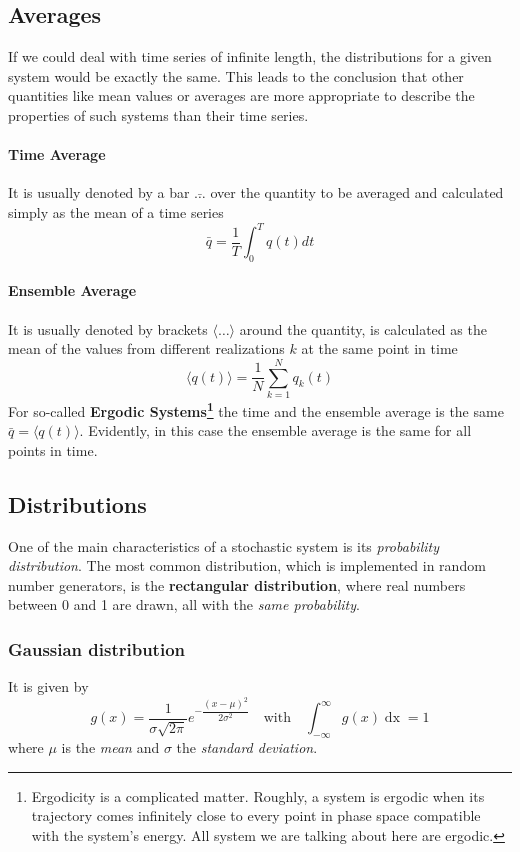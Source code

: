 \subsection{Averages}
If we could deal with time series of infinite length, the distributions for a given system would be exactly the same.
This leads to the conclusion that other quantities like mean values or averages are more appropriate to describe the properties of such systems than their time series.
\paragraph{Time Average}
It is usually denoted by a bar $\bar{\ldots}$ over the quantity to be
averaged and calculated simply as the mean of a time series
\begin{equation}
	\bar{q}=\frac{1}{T}\int_0^T q(t)dt
\end{equation}
\paragraph{Ensemble Average}
It is usually denoted by brackets $\langle \ldots\rangle$ around the quantity, is calculated as the mean of the values from different realizations $k$ at the same point in time
\begin{equation}
	\langle q(t)\rangle=\frac{1}{N}\sum_{k=1}^N q_k(t)
\end{equation}
For so-called \textbf{Ergodic Systems\footnote{Ergodicity is a complicated matter. Roughly, a system is ergodic when its trajectory comes infinitely close to every point in phase space compatible with the system’s energy. All system we are talking about here are ergodic.}} the time and the ensemble average is the same $\bar{q}=\langle q(t)\rangle$.
Evidently, in this case the ensemble average is the same for all points in time.
\subsection{Distributions}
One of the main characteristics of a stochastic system is its \emph{probability distribution}.
The most common distribution, which is implemented in random number generators, is the \textbf{rectangular distribution}, where real numbers between 0 and 1 are drawn, all with the \emph{same probability}.
\subsubsection{Gaussian distribution}
It is given by
\begin{equation}
	g(x)=\frac{1}{\sigma\sqrt{2\pi}}e^{-\dfrac{(x-\mu)^2}{2\sigma^2}}\quad\text{with}\quad\int_{-\infty}^\infty g(x)\mathop{dx}=1
\end{equation}
where $\mu$ is the \emph{mean} and $\sigma$ the \emph{standard deviation}.
